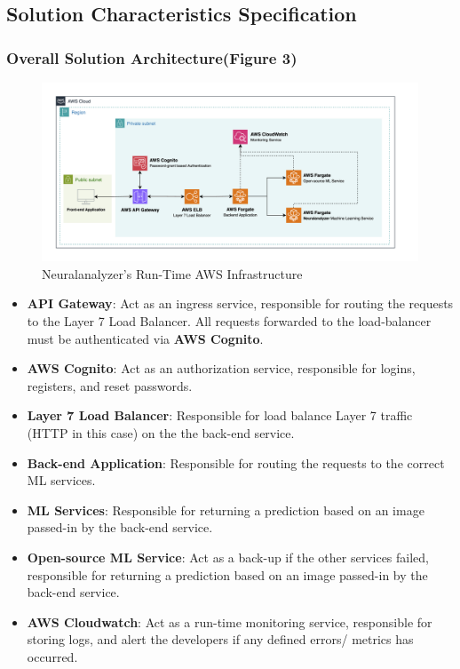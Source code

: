 \documentclass[12pt]{article}
\begin{document}
\subsection{Solution Characteristics Specification}
\subsubsection{Overall Solution Architecture(Figure 3)}
\begin{figure}[h!]
  \centering
  \includegraphics[width=1\textwidth]{app-runtime.png}
  \caption{Neuralanalyzer's Run-Time AWS Infrastructure}
  \label{fig:overall-runtime-infra}
\end{figure}

\begin{itemize}
    \item \textbf{API Gateway}: Act as an ingress service, responsible for routing the requests to the Layer 7 Load Balancer. All requests forwarded to the load-balancer must be authenticated via \textbf{AWS Cognito}.
    \item \textbf{AWS Cognito}: Act as an authorization service, responsible for logins, registers, and reset passwords.
    \item \textbf{Layer 7 Load Balancer}: Responsible for load balance Layer 7 traffic (HTTP in this case) on the the back-end service.
    \item \textbf{Back-end Application}: Responsible for routing the requests to the correct ML services.
    \item \textbf{ML Services}: Responsible for returning a prediction based on an image passed-in by the back-end service.
    \item \textbf{Open-source ML Service}: Act as a back-up if the other services failed, responsible for returning a prediction based on an image passed-in by the back-end service.
    \item \textbf{AWS Cloudwatch}: Act as a run-time monitoring service, responsible for storing logs, and alert the developers if any defined errors/ metrics has occurred.
\end{itemize}
\end{document}
